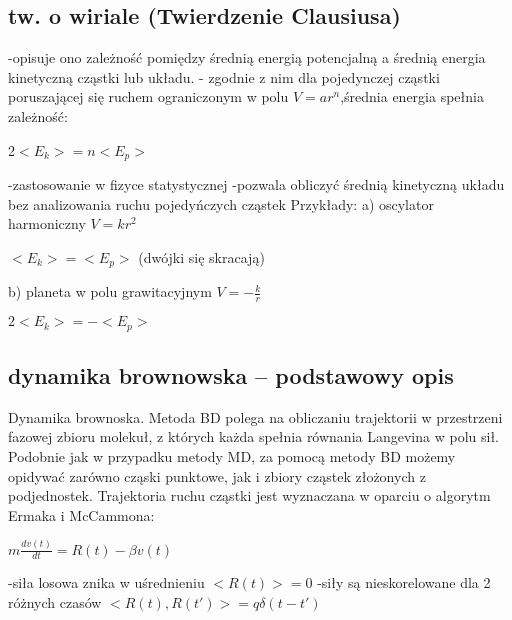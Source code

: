 \documentclass{article}
\begin{document}
		\subsection{tw. o wiriale (Twierdzenie Clausiusa)}
		-opisuje ono zależność pomiędzy średnią energią potencjalną a średnią energia kinetyczną cząstki lub układu.\newline	
		- zgodnie z nim dla pojedynczej cząstki poruszającej się ruchem ograniczonym w polu $V=ar^{n}$,średnia energia spełnia zależność:\newline	
		\begin{center}
			2$<E_{k}>=n<E_{p}>$\newline
		\end{center}
		-zastosowanie w fizyce statystycznej\newline	
		-pozwala obliczyć średnią kinetyczną układu bez analizowania ruchu pojedyńczych
		cząstek\newline					
		Przykłady:\newline		
		a) oscylator harmoniczny $V=k{r}^{2}$\newline		
		\begin{center}
			$<E_{k}> = <E_{p}>$ (dwójki się skracają)\newline	
		\end{center}		
		b) planeta w polu grawitacyjnym $V=-\frac{k}{r}$\newline
		\begin{center}
			$2<E_{k}>=-<E_{p}>$\newline
		\end{center}	
		
		\subsection{dynamika brownowska	– podstawowy opis}
		Dynamika brownoska. Metoda BD polega na obliczaniu trajektorii w przestrzeni fazowej zbioru molekuł, z których każda spełnia równania Langevina w polu sił. Podobnie jak w przypadku metody MD, za pomocą metody BD możemy opidywać zarówno cząski punktowe, jak i zbiory cząstek złożonych z podjednostek. Trajektoria ruchu cząstki jest wyznaczana w oparciu o algorytm Ermaka i McCammona:\newline
		\begin{center}
			$m\frac{dv(t)}{dt}=R(t)-\beta v(t)$\newline
		\end{center}
		-siła losowa znika w uśrednieniu $<R(t)>=0$\newline
		-siły są nieskorelowane dla 2 różnych czasów $<R(t),R(t')>=q\delta (t-t')$\newline
		
\end{document}
